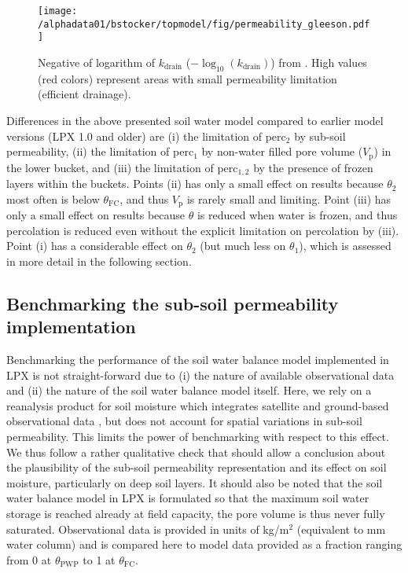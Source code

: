 \begin{figure}[ht!]
\begin{center}
  \texttt{[image: /alphadata01/bstocker/topmodel/fig/permeability\_gleeson.pdf]}
\end{center}
\caption{Negative of logarithm of $k_{\text{drain}}$ ($-\log_{10}(k_{\text{drain}})$) from \citet{gleeson11grl}. High values (red colors) represent areas with small permeability limitation (efficient drainage).}
\label{fig:perm}
\end{figure}


Differences in the above presented soil water model compared to earlier model versions (LPX 1.0 and older) are (i) the limitation of perc$_2$ by sub-soil permeability, (ii) the limitation of perc$_1$ by non-water filled pore volume ($V_{\text{p}}$) in the lower bucket, and (iii) the limitation of perc$_{1,2}$ by the presence of frozen layers within the buckets. Points (ii) has only a small effect on results because $\theta_2$ most often is below $\theta_{\text{FC}}$, and thus $V_{\text{p}}$ is rarely small and limiting. Point (iii) has only a small effect on results because $\theta$ is reduced when water is frozen, and thus percolation is reduced even without the explicit limitation on percolation by (iii). Point (i) has a considerable effect on $\theta_2$ (but much less on $\theta_1$), which is assessed in more detail in the following section.


\subsection{Benchmarking the sub-soil permeability implementation}
\label{app:permbench}
Benchmarking the performance of the soil water balance model implemented in LPX is not straight-forward due to (i) the nature of available observational data and (ii) the nature of the soil water balance model itself. Here, we rely on a reanalysis product for soil moisture which integrates satellite and ground-based observational data \citep{rodell04bams}, but does not account for spatial variations in sub-soil permeability. This limits the power of benchmarking with respect to this effect. We thus follow a rather qualitative check that should allow a conclusion about the plausibility of the sub-soil permeability representation and its effect on soil moisture, particularly on deep soil layers. It should also be noted that the soil water balance model in LPX is formulated so that the maximum soil water storage is reached already at field capacity, the pore volume is thus never fully saturated. %
Observational data is provided in units of kg/m$^2$ (equivalent to mm water column) and is compared here to model data provided as a fraction ranging from 0 at $\theta_{\text{PWP}}$ to 1 at $\theta_{\text{FC}}$.\\

